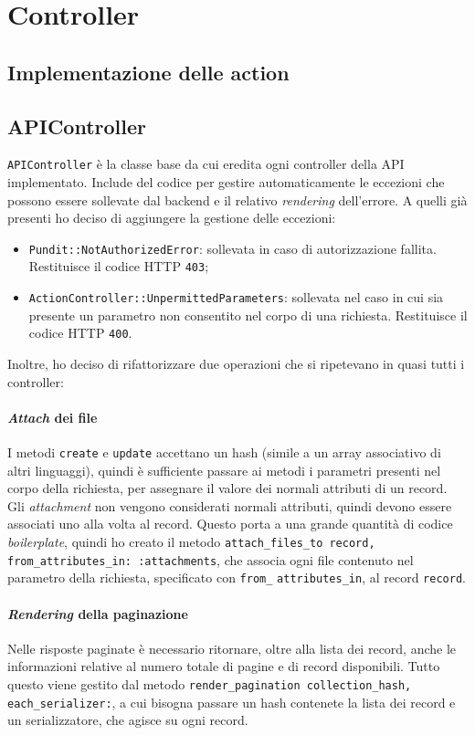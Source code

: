 \section{Controller}
\subsection{Implementazione delle action}

\subsection{APIController}
\verb|APIController| è la classe base da cui eredita ogni controller della API implementato. Include del codice per gestire automaticamente le eccezioni che possono essere sollevate dal backend e il relativo \emph{rendering} dell'errore. A quelli già presenti ho deciso di aggiungere la gestione delle eccezioni:
\begin{itemize}
	\item \verb|Pundit::NotAuthorizedError|: sollevata in caso di autorizzazione fallita. Restituisce il codice HTTP \verb|403|;
	\item \verb|ActionController::UnpermittedParameters|: sollevata nel caso in cui sia presente un parametro non consentito nel corpo di una richiesta. Restituisce il codice HTTP \verb|400|.
\end{itemize}
Inoltre, ho deciso di rifattorizzare due operazioni che si ripetevano in quasi tutti i controller:

\paragraph{\emph{Attach} dei file} I metodi \verb|create| e \verb|update| accettano un hash (simile a un array associativo di altri linguaggi), quindi è sufficiente passare ai metodi i parametri presenti nel corpo della richiesta, per assegnare il valore dei normali attributi di un record. Gli \emph{attachment} non vengono considerati normali attributi, quindi devono essere associati uno alla volta al record. Questo porta a una grande quantità di codice \emph{boilerplate}, quindi ho creato il metodo \texttt{attach_files_to record, from_attributes_in: :attachments}, che associa ogni file contenuto nel parametro della richiesta, specificato con \verb|from_| \verb|attributes_in|, al record \verb|record|.

\paragraph{\emph{Rendering} della paginazione} Nelle risposte paginate è necessario ritornare, oltre alla lista dei record, anche le informazioni relative al numero totale di pagine e di record disponibili. Tutto questo viene gestito dal metodo \texttt{render_pagination collection_hash,} \texttt{each_serializer:}, a cui bisogna passare un hash contenete la lista dei record e un serializzatore, che agisce su ogni record.

